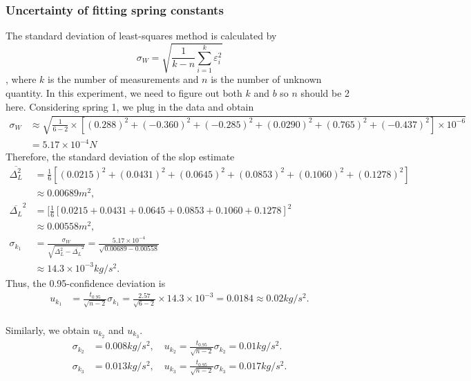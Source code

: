 \subsubsection{Uncertainty of fitting spring constants}
    The standard deviation of least-squares method is calculated by
    \[
        \sigma_W=\sqrt{\frac{1}{k-n}\sum_{i=1}^{k}\varepsilon_i^2}
    \],
    where $k$ is the number of measurements and $n$ is the number of unknown quantity. In this experiment, we need to figure out both $k$ and $b$ so $n$ should be 2 here. Considering spring 1, we plug in the data and obtain
    \[
    \begin{split}
        \sigma_W&\approx \sqrt{\frac{1}{6-2}\times [(0.288)^2+(-0.360)^2+(-0.285)^2+(0.0290)^2+(0.765)^2+(-0.437)^2]\times 10^{-6}}\\
        &=5.17\times10^{-4} N
    \end{split}
    \]
    Therefore, the standard deviation of the slop estimate
    \[
    \begin{split}
        \overline{\Delta_L^2}&=\frac{1}{6}[(0.0215)^2+(0.0431)^2+(0.0645)^2+(0.0853)^2+(0.1060)^2+(0.1278)^2]\\[0.2cm]
        &\approx 0.00689 m^2,\\[0.4cm]
        \overline{\Delta_L}^2&=[\frac{1}{6}[0.0215+0.0431+0.0645+0.0853+0.1060+0.1278]^2\\[0.2cm]
        &\approx 0.00558 m^2,\\[0.4cm]
        \sigma_{k_1}&=\frac{\sigma_W}{\sqrt{\overline{\Delta_L^2}-\overline{\Delta_L}^2}}=\frac{5.17\times10^{-4}}{\sqrt{0.00689-0.00558}}\\[0.2cm]
        &\approx14.3\times10^{-3} kg/s^2.
    \end{split}
    \]
    Thus, the 0.95-confidence deviation is 
    \[
    \begin{split}
        u_{k_1}&=\frac{t_{0.95}}{\sqrt{n-2}}\sigma_{k_1}=\frac{2.57}{\sqrt{6-2}}\times14.3\times10^{-3}= 0.0184\approx 0.02kg/s^2.\\[0.4cm]
    \end{split}
    \]
    
    Similarly, we obtain $u_{k_2}$ and $u_{k_3}$.
    \[
    \begin{split}
        \sigma_{k_2}&=0.008kg/s^2,\quad
        u_{k_2}=\frac{t_{0.95}}{\sqrt{n-2}}\sigma_{k_2}=0.01kg/s^2.\\
        \sigma_{k_3}&=0.013kg/s^2,\quad
        u_{k_3}=\frac{t_{0.95}}{\sqrt{n-2}}\sigma_{k_3}=0.017kg/s^2.\\
    \end{split}
    \]
    
